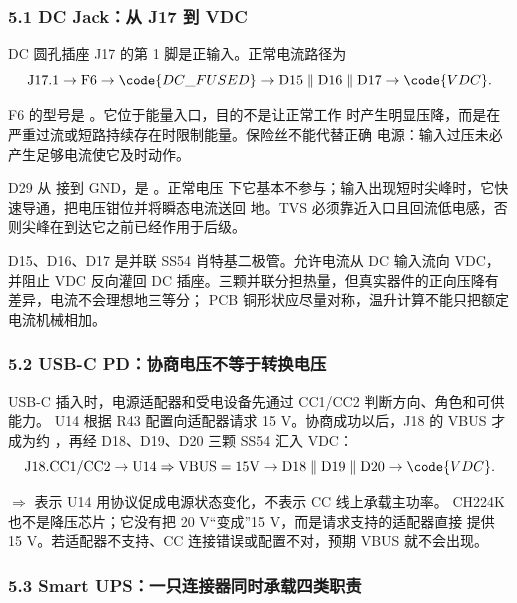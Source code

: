 
\subsubsection{5.1 DC Jack：从 J17 到 VDC}

DC 圆孔插座 J17 的第 1 脚是正输入。正常电流路径为
\[
\mathrm{J17.1}
\rightarrow \mathrm{F6}
\rightarrow \code{DC\_FUSED}
\rightarrow \mathrm{D15\parallel D16\parallel D17}
\rightarrow \code{VDC}.
\]

F6 的型号是 。它位于能量入口，目的不是让正常工作
时产生明显压降，而是在严重过流或短路持续存在时限制能量。保险丝不能代替正确
电源：输入过压未必产生足够电流使它及时动作。

D29  从  接到 GND，是
。正常电压
下它基本不参与；输入出现短时尖峰时，它快速导通，把电压钳位并将瞬态电流送回
地。TVS 必须靠近入口且回流低电感，否则尖峰在到达它之前已经作用于后级。

D15、D16、D17 是并联 SS54 肖特基二极管。允许电流从 DC 输入流向 VDC，并阻止 VDC 反向灌回 DC
插座。三颗并联分担热量，但真实器件的正向压降有差异，电流不会理想地三等分；
PCB 铜形状应尽量对称，温升计算不能只把额定电流机械相加。

\subsubsection{5.2 USB-C PD：协商电压不等于转换电压}

USB-C 插入时，电源适配器和受电设备先通过 CC1/CC2 判断方向、角色和可供能力。
U14  根据 R43 配置向适配器请求 15 V。协商成功以后，J18 的
VBUS 才成为约 ，再经 D18、D19、D20 三颗 SS54 汇入 VDC：
\[
\mathrm{J18.CC1/CC2}
\rightarrow \mathrm{U14}
\Rightarrow \mathrm{VBUS}=15\mathrm{V}
\rightarrow \mathrm{D18\parallel D19\parallel D20}
\rightarrow \code{VDC}.
\]

\(\Rightarrow\) 表示 U14 用协议促成电源状态变化，不表示 CC 线上承载主功率。
CH224K 也不是降压芯片；它没有把 20 V“变成”15 V，而是请求支持的适配器直接
提供 15 V。若适配器不支持、CC 连接错误或配置不对，预期 VBUS 就不会出现。

\subsubsection{5.3 Smart UPS：一只连接器同时承载四类职责}

